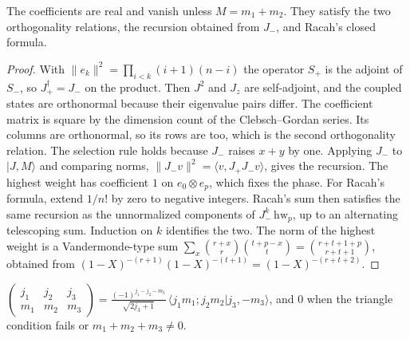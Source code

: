 \begin{theorem}\label{thm:cg-coeff}
  \leanok
  The coefficients are real and vanish unless $M=m_1+m_2$. They satisfy the two orthogonality relations, the recursion
  obtained from $J_-$, and Racah's closed formula.
\end{theorem}
\begin{proof}\leanok
  With $\|e_k\|^2=\prod_{i<k}(i+1)(n-i)$ the operator $S_+$ is the adjoint of $S_-$, so $J_+^\dagger=J_-$ on the product.
  Then $J^2$ and $J_z$ are self-adjoint, and the coupled states are orthonormal because their eigenvalue pairs differ. The
  coefficient matrix is square by the dimension count of the Clebsch--Gordan series. Its columns are orthonormal, so its rows
  are too, which is the second orthogonality relation. The selection rule holds because $J_-$ raises $x+y$ by one. Applying
  $J_-$ to $|J,M\rangle$ and comparing norms, $\|J_-v\|^2=\langle v,J_+J_-v\rangle$, gives the recursion. The highest weight
  has coefficient $1$ on $e_0\otimes e_p$, which fixes the phase. For Racah's formula, extend $1/n!$ by zero to negative
  integers. Racah's sum then satisfies the same recursion as the unnormalized components of $J_-^k\,\mathrm{hw}_p$, up to
  an alternating telescoping sum. Induction on $k$ identifies the two. The norm of the highest weight is a Vandermonde-type
  sum $\sum_x\binom{r+x}{r}\binom{t+p-x}{t}=\binom{r+t+1+p}{r+t+1}$, obtained from $(1-X)^{-(r+1)}(1-X)^{-(t+1)}=(1-X)^{-(r+t+2)}$.
\end{proof}
\begin{definition}\label{def:3j}
  \leanok
  $\begin{pmatrix}j_1&j_2&j_3\\m_1&m_2&m_3\end{pmatrix}=\frac{(-1)^{j_1-j_2-m_3}}{\sqrt{2j_3+1}}\,
  \langle j_1m_1;j_2m_2|j_3,-m_3\rangle$, and $0$ when the triangle condition fails or $m_1+m_2+m_3\neq0$.
\end{definition}


